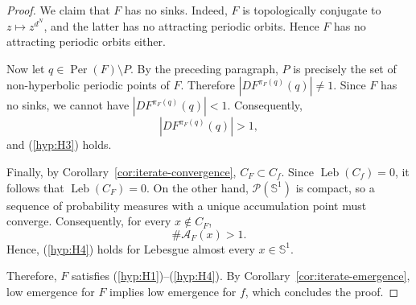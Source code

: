 \documentclass[12pt,a4paper,twoside]{article}
\theoremstyle{plain}
\theoremstyle{definition}
\newcommand{\cA}{{\mathcal A}}
\newcommand{\cP}{{\mathcal P}}
\newcommand{\Leb}{\operatorname{Leb}}
\newcommand{\Sone}{\mathbb{S}^1}
\begin{document}
\begin{proof}
We claim that \(F\) has no sinks. Indeed, \(F\) is topologically
conjugate to \(z\mapsto z^{d^N}\), and the latter has no attracting
periodic orbits. Hence \(F\) has no attracting periodic orbits either.

Now let \(q\in\operatorname{Per}(F)\setminus P\). By the preceding
paragraph, \(P\) is precisely the set of non-hyperbolic periodic points
of \(F\). Therefore $|DF^{\pi_F(q)}(q)|\neq1$. Since \(F\) has no sinks, we cannot have $|DF^{\pi_F(q)}(q)|<1$. Consequently,
\[
|DF^{\pi_F(q)}(q)|>1,
\]
and (\ref{hyp:H3}) holds.

	Finally, by Corollary~\ref{cor:iterate-convergence}, $C_F\subset C_f$. Since $\Leb(C_f)=0$, it follows that $\Leb(C_F)=0$. On the other hand, $\cP(\Sone)$ is compact, so a sequence of probability measures with a unique accumulation point must converge. Consequently, for every $x\notin C_F$,
	\[
	\#\cA_F(x)>1.
	\]
	Hence, (\ref{hyp:H4}) holds for Lebesgue almost every $x\in\Sone$.

	Therefore, $F$ satisfies (\ref{hyp:H1})--(\ref{hyp:H4}). By
	Corollary~\ref{cor:iterate-emergence}, low emergence for $F$ implies low emergence for $f$, which concludes the proof.
\end{proof}
\end{document}
